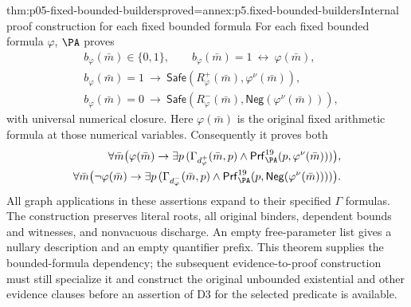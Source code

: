 \begin{hbtheorem}{thm:p05-fixed-bounded-builders}{proved=annex:p5.fixed-bounded-builders}{Internal proof construction for each fixed bounded formula}
For each fixed bounded formula \(\varphi\), \(\PA\) proves
\[
\begin{aligned}
 &b_\varphi(\bar m)\in\{0,1\},\qquad
             b_\varphi(\bar m)=1\ \leftrightarrow\ \varphi(\bar m),\\
 &b_\varphi(\bar m)=1\ \longrightarrow\
             \mathsf{Safe}(R_\varphi^+(\bar m),\varphi^\nu(\bar m)),\\
 &b_\varphi(\bar m)=0\ \longrightarrow\
             \mathsf{Safe}(R_\varphi^-(\bar m),\mathsf{Neg}(\varphi^\nu(\bar m))),
\end{aligned}
\]
with universal numerical closure. Here \(\varphi(\bar m)\) is the
original fixed arithmetic formula at those numerical variables. Consequently
it proves both
\[
\begin{aligned}
 \forall\bar m\bigl(\varphi(\bar m)\to\exists p\,
  (\Gamma_{d_\varphi^+}(\bar m,p)\land
                \mathsf{Prf}^{19}_{\PA}(p,\varphi^\nu(\bar m)))\bigr),\\
 \forall\bar m\bigl(\neg\varphi(\bar m)\to\exists p\,
  (\Gamma_{d_\varphi^-}(\bar m,p)\land
       \mathsf{Prf}^{19}_{\PA}(p,\mathsf{Neg}(\varphi^\nu(\bar m))))\bigr).
\end{aligned}
\]
All graph applications in these assertions expand to their specified
\(\Gamma\) formulas. The construction preserves literal roots, all
original binders, dependent bounds and witnesses, and nonvacuous discharge.
An empty free-parameter list gives a nullary description and an empty
quantifier prefix. This theorem supplies the bounded-formula dependency;
the subsequent evidence-to-proof construction must still specialize it and
construct the original unbounded existential and other evidence clauses
before an assertion of D3 for the selected predicate is available.
\end{hbtheorem}

